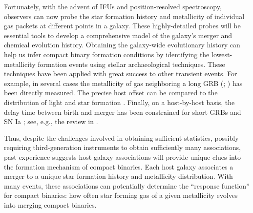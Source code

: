 \documentclass[nofootinbib,twocolumn,prd]{emulateapj}
\newcommand\editremark[1]{{\color{red}#1}}
\newcommand\jillianremark[1]{{\color{blue}#1}}
\begin{document}
%
Fortunately,  with the advent of
IFUs and position-resolved spectroscopy, observers can now probe the star formation history and metallicity of individual gas packets at different points in a galaxy.  
These highly-detailed probes will be essential tools to develop a comprehensive model of the galaxy's merger and
chemical evolution history.    Obtaining the galaxy-wide evolutionary history can help us infer compact binary formation
conditions by identifying the lowest-metallicity formation events using stellar archaeological techniques.  
These techniques have been applied with great success to other transient events. 
For example, in several cases the metallicity of gas neighboring a long GRB (\citet{ 2008AJ....135.1136M};
\citet{2010AJ....140.1557L}) has been directly measured.  %
%
The precise host offset can be compared to the distribution of light and star formation  \citep{2010ApJ...708....9F}.
%
Finally,  on a host-by-host basis, the delay time between birth and merger has been constrained for
short GRBs \citep{2010ApJ...725.1202L}
 and
  SN Ia \citep{2011MNRAS.412.1508M}; see, e.g., the review in  \cite{2014ARAA..52...43B}. 

  

%


Thus, despite the challenges involved in obtaining sufficient statistics, possibly requiring third-generation instruments to
obtain sufficiently many associations, past experience suggests  host galaxy associations
will provide unique clues into the formation mechanism of compact binaries.
% 
Each host galaxy associates a merger to a unique star formation history and metallicity distribution.
With many events, these associations can potentially determine the ``response function'' for compact binaries: how often star forming gas of a given metallicity evolves into
merging compact binaries.    
%
%
\end{document}
